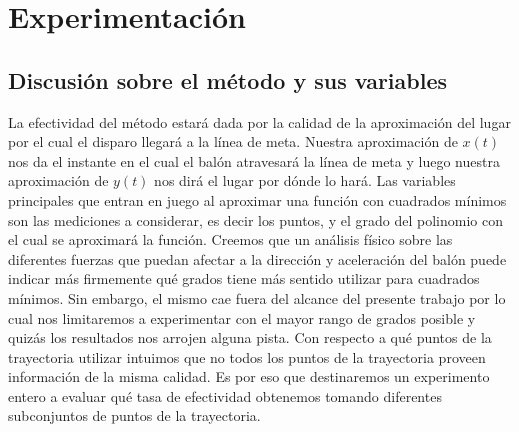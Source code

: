 \section{Experimentación}

\subsection{Discusión sobre el método y sus variables}
La efectividad del método estará dada por la calidad de la aproximación del lugar por el cual el disparo llegará a la línea de meta. 
Nuestra aproximación de $x(t)$ nos da el instante en el cual el balón atravesará la línea de meta y luego nuestra aproximación
de $y(t)$ nos dirá el lugar por dónde lo hará. Las variables principales que entran en juego al aproximar una función con 
cuadrados mínimos son las mediciones a considerar, es decir los puntos, y el grado del polinomio con el cual se aproximará la función.
Creemos que un análisis físico sobre las diferentes fuerzas que puedan afectar a la dirección y aceleración del balón puede indicar 
más firmemente qué grados tiene más sentido utilizar para cuadrados mínimos. Sin embargo, el mismo cae fuera del alcance del presente 
trabajo por lo cual nos limitaremos a experimentar con el mayor rango de grados posible y quizás los resultados nos arrojen alguna pista.
Con respecto a qué puntos de la trayectoria utilizar intuimos que no todos los puntos de la trayectoria proveen información de la misma 
calidad. Es por eso que destinaremos un experimento entero a evaluar qué tasa de efectividad obtenemos tomando diferentes subconjuntos 
de puntos de la trayectoria.

